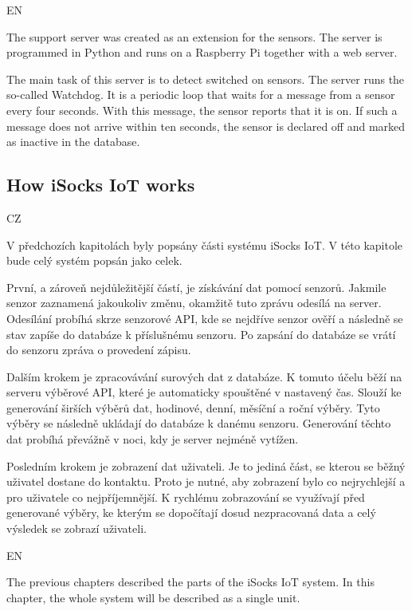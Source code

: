\documentclass[12pt, a4paper]{article}
\begin{document}
EN

The support server was created as an extension for the sensors.
The server is programmed in Python and runs on a Raspberry Pi together with a web server.\newline

The main task of this server is to detect switched on sensors.
The server runs the so-called Watchdog.
It is a periodic loop that waits for a message from a sensor every four seconds.
With this message, the sensor reports that it is on. If such a message does not arrive within ten seconds, the sensor is declared off and marked as inactive in the database.


\subsection*{How iSocks IoT works}

CZ

V předchozích kapitolách byly popsány části systému iSocks IoT.
V této kapitole bude celý systém popsán jako celek.

První, a zároveň nejdůležitější částí, je získávání dat pomocí senzorů.
Jakmile senzor zaznamená jakoukoliv změnu, okamžitě tuto zprávu odesílá na server.
Odesílání probíhá skrze senzorové API, kde se nejdříve senzor ověří a následně se stav zapíše do databáze k příslušnému senzoru.
Po zapsání do databáze se vrátí do senzoru zpráva o provedení zápisu.

Dalším krokem je zpracovávání surových dat z databáze.
K tomuto účelu běží na serveru výběrové API, které je automaticky spouštěné v nastavený čas.
Slouží ke generování širších výběrů dat, hodinové, denní, měsíční a roční výběry.
Tyto výběry se následně ukládají do databáze k danému senzoru.
Generování těchto dat probíhá převážně v noci, kdy je server nejméně vytížen.

Posledním krokem je zobrazení dat uživateli.
Je to jediná část, se kterou se běžný uživatel dostane do kontaktu.
Proto je nutné, aby zobrazení bylo co nejrychlejší a pro uživatele co nejpříjemnější.
K rychlému zobrazování se využívají před generované výběry, ke kterým se dopočítají dosud nezpracovaná data a celý výsledek se zobrazí uživateli.

EN

The previous chapters described the parts of the iSocks IoT system.
In this chapter, the whole system will be described as a single unit.
\end{document}
